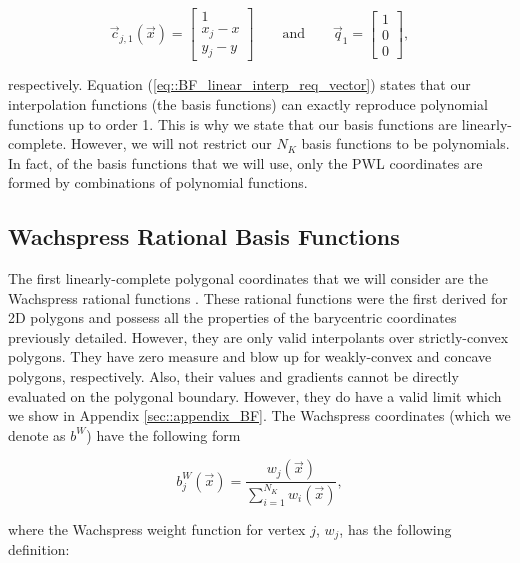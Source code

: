 \begin{equation}
\vec{c}_{j,1}(\vec{x}) = \left[
\begin{array}{c}
1 \\
x_j - x \\
y_j - y
\end{array} \right]
  \qquad \text{and} \qquad \vec{q}_1 = \left[
\begin{array}{c}
1 \\
0 \\
0
\end{array} \right],
\label{eq::BF_linear_constraint_terms}
\end{equation}

\noindent respectively. Equation (\ref{eq::BF_linear_interp_req_vector}) states that our interpolation functions (the basis functions) can exactly reproduce polynomial functions up to order 1. This is why we state that our basis functions are linearly-complete. However, we will not restrict our $N_K$ basis functions to be polynomials. In fact, of the basis functions that we will use, only the PWL coordinates are formed by combinations of polynomial functions.


\subsection{Wachspress Rational Basis Functions}
\label{sec::BF_2DLinear_Wachspress}

The first linearly-complete polygonal coordinates that we will consider are the Wachspress rational functions \cite{wachspress1975rational}. These rational functions were the first derived for 2D polygons and possess all the properties of the barycentric coordinates previously detailed. However, they are only valid interpolants over strictly-convex polygons. They have zero measure and blow up for weakly-convex and concave polygons, respectively. Also, their values and gradients cannot be directly evaluated on the polygonal boundary. However, they do have a valid limit which we show in Appendix \ref{sec::appendix_BF}. The Wachspress coordinates (which we denote as $b^W$) have the following form

\begin{equation}
\label{eq::BF_wach_BF}
b_{j}^{W} (\vec{x}) = \frac{w_j (\vec{x}) }{\sum\limits_{i=1}^{N_K} w_i (\vec{x})},
\end{equation}

\noindent where the Wachspress weight function for vertex $j$, $w_j$, has the following definition:

